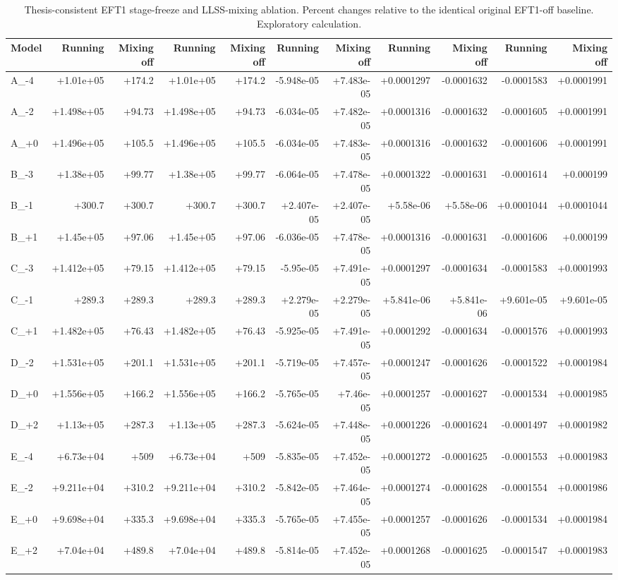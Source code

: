 \begin{table}[htbp]
\centering
\scriptsize
\begin{tabular}{lrrrrrrrrrr}
\hline
Model & Running & Mixing off & Running & Mixing off & Running & Mixing off & Running & Mixing off & Running & Mixing off \\
\hline
A\_-4 & +1.01e+05 & +174.2 & +1.01e+05 & +174.2 & -5.948e-05 & +7.483e-05 & +0.0001297 & -0.0001632 & -0.0001583 & +0.0001991 \\
A\_-2 & +1.498e+05 & +94.73 & +1.498e+05 & +94.73 & -6.034e-05 & +7.482e-05 & +0.0001316 & -0.0001632 & -0.0001605 & +0.0001991 \\
A\_+0 & +1.496e+05 & +105.5 & +1.496e+05 & +105.5 & -6.034e-05 & +7.483e-05 & +0.0001316 & -0.0001632 & -0.0001606 & +0.0001991 \\
B\_-3 & +1.38e+05 & +99.77 & +1.38e+05 & +99.77 & -6.064e-05 & +7.478e-05 & +0.0001322 & -0.0001631 & -0.0001614 & +0.000199 \\
B\_-1 & +300.7 & +300.7 & +300.7 & +300.7 & +2.407e-05 & +2.407e-05 & +5.58e-06 & +5.58e-06 & +0.0001044 & +0.0001044 \\
B\_+1 & +1.45e+05 & +97.06 & +1.45e+05 & +97.06 & -6.036e-05 & +7.478e-05 & +0.0001316 & -0.0001631 & -0.0001606 & +0.000199 \\
C\_-3 & +1.412e+05 & +79.15 & +1.412e+05 & +79.15 & -5.95e-05 & +7.491e-05 & +0.0001297 & -0.0001634 & -0.0001583 & +0.0001993 \\
C\_-1 & +289.3 & +289.3 & +289.3 & +289.3 & +2.279e-05 & +2.279e-05 & +5.841e-06 & +5.841e-06 & +9.601e-05 & +9.601e-05 \\
C\_+1 & +1.482e+05 & +76.43 & +1.482e+05 & +76.43 & -5.925e-05 & +7.491e-05 & +0.0001292 & -0.0001634 & -0.0001576 & +0.0001993 \\
D\_-2 & +1.531e+05 & +201.1 & +1.531e+05 & +201.1 & -5.719e-05 & +7.457e-05 & +0.0001247 & -0.0001626 & -0.0001522 & +0.0001984 \\
D\_+0 & +1.556e+05 & +166.2 & +1.556e+05 & +166.2 & -5.765e-05 & +7.46e-05 & +0.0001257 & -0.0001627 & -0.0001534 & +0.0001985 \\
D\_+2 & +1.13e+05 & +287.3 & +1.13e+05 & +287.3 & -5.624e-05 & +7.448e-05 & +0.0001226 & -0.0001624 & -0.0001497 & +0.0001982 \\
E\_-4 & +6.73e+04 & +509 & +6.73e+04 & +509 & -5.835e-05 & +7.452e-05 & +0.0001272 & -0.0001625 & -0.0001553 & +0.0001983 \\
E\_-2 & +9.211e+04 & +310.2 & +9.211e+04 & +310.2 & -5.842e-05 & +7.464e-05 & +0.0001274 & -0.0001628 & -0.0001554 & +0.0001986 \\
E\_+0 & +9.698e+04 & +335.3 & +9.698e+04 & +335.3 & -5.765e-05 & +7.455e-05 & +0.0001257 & -0.0001626 & -0.0001534 & +0.0001984 \\
E\_+2 & +7.04e+04 & +489.8 & +7.04e+04 & +489.8 & -5.814e-05 & +7.452e-05 & +0.0001268 & -0.0001625 & -0.0001547 & +0.0001983 \\
\hline
\end{tabular}
\caption{Thesis-consistent EFT1 stage-freeze and LLSS-mixing ablation. Percent changes relative to the identical original EFT1-off baseline. Exploratory calculation.}
\end{table}
